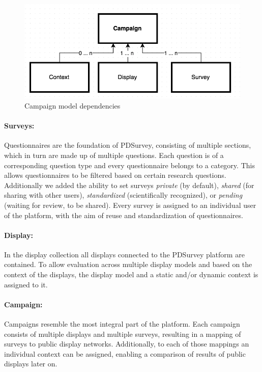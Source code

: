 \begin{figure}%
    \begin{center}
        \includegraphics[width=.8\columnwidth]{img/4_implementation/4-dependency-campaign}
    \end{center}
 \caption{Campaign model dependencies}
 \label{fig:4-dependency-campaign}
\end{figure}


	\paragraph{Surveys:} Questionnaires are the foundation of PDSurvey, consisting of multiple sections, which in turn are made up of multiple questions. Each question is of a corresponding question type and every questionnaire belongs to a category. This allows questionnaires to be filtered based on certain research questions. Additionally we added the ability to set surveys \textit{private} (by default), \textit{shared} (for sharing with other users), \textit{standardized} (scientifically recognized), or \textit{pending} (waiting for review, to be shared). Every survey is assigned to an individual user of the platform, with the aim of reuse and standardization of questionnaires.

	\paragraph{Display:} In the display collection all displays connected to the PDSurvey platform are contained. To allow evaluation across multiple display models and based on the context of the displays, the display model and a static and/or dynamic context is assigned to it.

	\paragraph{Campaign:} Campaigns resemble the most integral part of the platform. Each campaign consists of multiple displays and multiple surveys, resulting in a mapping of  surveys to public display networks. Additionally, to each of those mappings an individual context can be assigned, enabling a comparison of results of public displays later on.

